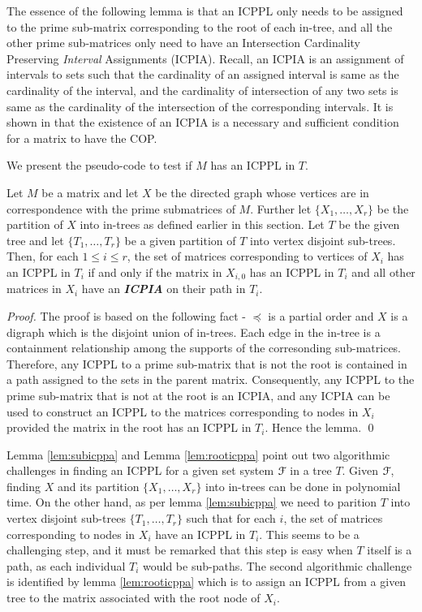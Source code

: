 \documentclass[a4paper,UKenglish,numberwithinsect]{lipics}
\def\cF{{\cal F}}
\begin{document}
\noindent
 The essence of the following lemma is that an ICPPL only needs to be
 assigned to the prime sub-matrix corresponding to the root of each
 in-tree, and all the other prime sub-matrices only need to have an
 Intersection Cardinality Preserving {\em Interval} Assignments (ICPIA).
 Recall, an ICPIA is an assignment of intervals to sets such that the
 cardinality of an assigned interval is same as the cardinality of the
 interval, and the cardinality of intersection of any two sets is same
 as the cardinality of the intersection of the corresponding
 intervals.  It is shown in \cite{nsnrs09} that the existence of an
 ICPIA is a necessary and sufficient condition for a matrix to have
 the COP. 

\noindent 
We present the pseudo-code to test if $M$ has an ICPPL in $T$. 
\begin{lemma} \label{lem:rooticppa}
Let $M$ be a matrix and let $X$ be the directed graph whose vertices
are in correspondence with the prime submatrices of $M$.  Further let
$\{X_1,\ldots,X_r\}$ be the partition of $X$ into in-trees as defined
earlier in this section. 
Let $T$ be the given tree and let $\{T_1, \ldots, T_r\}$ be a given
partition of $T$ into vertex disjoint sub-trees. 
Then, for each $1 \leq i \leq r$, the set of matrices corresponding to
vertices of $X_i$ has an ICPPL in $T_i$ if and only if the matrix in
$X_{i,0}$ has an ICPPL in $T_i$ and all other matrices in $X_i$ have
an {\bf {\em ICPIA}} on their path in $T_i$. 
\end{lemma}
\begin{proof}
The proof is based on the following fact - $\preccurlyeq$ is a partial
order and $X$ is a digraph which is the disjoint 
union of in-trees.  Each edge in the in-tree is a containment
relationship among the supports of the corresonding
sub-matrices. Therefore, any ICPPL to a prime sub-matrix that is not
the root is contained in a path assigned to the sets in the parent
matrix.  Consequently, any ICPPL to the prime sub-matrix that is not
at the root is an ICPIA, and any ICPIA can be used to construct an
ICPPL to the matrices corresponding to nodes in $X_i$ provided the
matrix in the root has an ICPPL in $T_i$.   Hence the lemma. \qed
\end{proof}
Lemma \ref{lem:subicppa} and Lemma \ref{lem:rooticppa} point out two
algorithmic challenges in finding an ICPPL for a given set system
$\cF$ in a tree $T$.  Given $\cF$, finding $X$ and its partition
$\{X_1,\ldots,X_r\}$ into in-trees can be done in polynomial time.  On
the other hand, as per lemma \ref{lem:subicppa} we need to parition
$T$ into vertex disjoint sub-trees $\{T_1, \ldots, T_r\}$ such that
for each $i$, the set of matrices corresponding  to nodes in $X_i$
have an ICPPL in $T_i$.  This seems to be a challenging step, and it
must be remarked that this step is easy when $T$ itself is a path, as
each individual $T_i$ would be sub-paths.  The second algorithmic
challenge is identified by lemma \ref{lem:rooticppa} which is to
assign an ICPPL from a given tree to the matrix associated with the
root node of $X_i$. 
  
\end{document}
